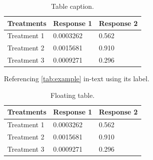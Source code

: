 \documentclass[
	11pt,
	fleqn,
	a4paper,
]{LegrandOrangeBook}
\begin{document}
\begin{table}[H] %
    \centering %
    \begin{tabular}{L{0.15\textwidth} R{0.15\textwidth} R{0.15\textwidth}} %
        \toprule
        \textbf{Treatments} & \textbf{Response 1} & \textbf{Response 2} \\
        \midrule
        Treatment 1         & 0.0003262           & 0.562               \\
        Treatment 2         & 0.0015681           & 0.910               \\
        Treatment 3         & 0.0009271           & 0.296               \\
        \bottomrule
    \end{tabular}
    \caption{Table caption.}
    \label{tab:example} %
\end{table}

Referencing \autoref{tab:example} in-text using its label.

\begin{table}[t] %
    \centering %
    \begin{tabular}{L{0.15\textwidth} R{0.15\textwidth} R{0.15\textwidth}} %
        \toprule
        \textbf{Treatments} & \textbf{Response 1} & \textbf{Response 2} \\
        \midrule
        Treatment 1         & 0.0003262           & 0.562               \\
        Treatment 2         & 0.0015681           & 0.910               \\
        Treatment 3         & 0.0009271           & 0.296               \\
        \bottomrule
    \end{tabular}
    \caption{Floating table.}
    \label{tab:floating} %
\end{table}

\end{document}

